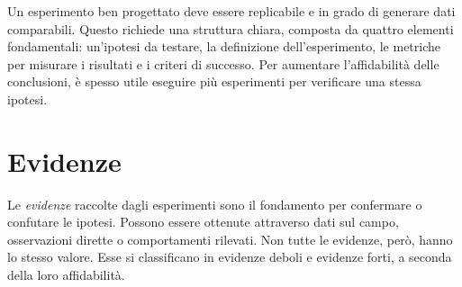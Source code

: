 Un esperimento ben progettato deve essere replicabile e in grado di generare dati comparabili. Questo richiede una struttura chiara, composta da quattro elementi fondamentali: un’ipotesi da testare, la definizione dell’esperimento, le metriche per misurare i risultati e i criteri di successo. Per aumentare l’affidabilità delle conclusioni, è spesso utile eseguire più esperimenti per verificare una stessa ipotesi.

\section{Evidenze}
Le \textit{evidenze} raccolte dagli esperimenti sono il fondamento per confermare o confutare le ipotesi. Possono essere ottenute attraverso dati sul campo, osservazioni dirette o comportamenti rilevati. Non tutte le evidenze, però, hanno lo stesso valore. Esse si classificano in evidenze deboli e evidenze forti, a seconda della loro affidabilità.

